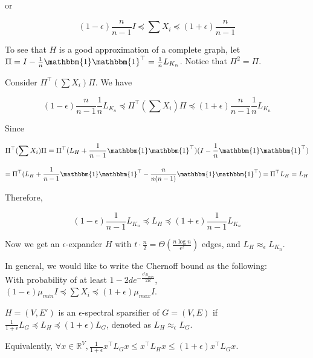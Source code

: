 \documentclass[11pt]{article}
\begin{document}
or

\[
	(1-\epsilon)\frac{n}{n-1} I \preceq \sum X_i \preceq (1+\epsilon)\frac{n}{n-1}
\]

\hfill \break

To see that $H$ is a good approximation of a complete graph, let $ \Pi = I - \frac{1}{n} \mathbbm{1}\mathbbm{1}^{\top} = \frac{1}{n} L_{K_n}$. Notice that $\Pi^2 = \Pi$.

Consider $\Pi^{\top} (\sum X_i) \Pi$. We have 

\[
	(1-\epsilon)\frac{n}{n-1} \frac{1}{n} L_{K_n} \preceq \Pi^{\top} (\sum X_i) \Pi \preceq (1+\epsilon)\frac{n}{n-1} \frac{1}{n} L_{K_n}
\]

Since

\[
	\Pi^{\top} (\sum X_i) \Pi = \Pi^{\top} (L_H + \frac{1}{n-1} \mathbbm{1}\mathbbm{1}^{\top})(I - \frac{1}{n} \mathbbm{1}\mathbbm{1}^{\top}) 
\]

\[
	= \Pi^{\top} (L_H + \frac{1}{n-1} \mathbbm{1}\mathbbm{1}^{\top} - \frac{n}{n(n-1)} \mathbbm{1}\mathbbm{1}^{\top}) = \Pi^{\top} L_H = L_H
\]

Therefore,

\[
	(1-\epsilon)\frac{1}{n-1} L_{K_n} \preceq L_H \preceq (1+\epsilon)\frac{1}{n-1} L_{K_n}
\]

\hfill \break

Now we get an $\epsilon$-expander $H$ with $t \cdot \frac{n}{2} = \Theta (\frac{n\log n}{\epsilon^2})$ edges, and $L_H \approx_\epsilon L_{K_n}$.\\

\hfill \break

In general, we would like to write the Chernoff bound as the following: \\

With probability of at least $1 - 2de^{-\frac{\epsilon^2 \mu_{min}}{2R}}$, $(1-\epsilon) \mu_{min} I \preceq \sum X_i \preceq (1+\epsilon)\mu_{max} I$. \\


\begin{definition}
	
	$H=(V, E')$ is an $\epsilon$-spectral sparsifier of $G=(V, E)$ if $\frac{1}{1+\epsilon} L_G \preceq L_H \preceq (1+\epsilon) L_G$, denoted as $L_H \approx_\epsilon L_G$.
	
	Equivalently, $\forall x \in \mathbb{R}^V, \frac{1}{1+\epsilon} x^{\top} L_G x \le x^{\top} L_H x \le (1+\epsilon) x^{\top} L_G x$.
	
\end{definition}
\end{document}
